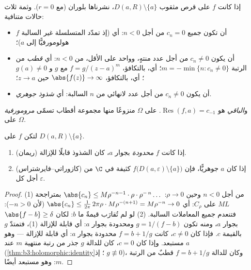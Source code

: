 \begin{definition}\label{def:b3:residues:singularities}
إذا كانت $f$  على قرص مثقوب $D(a, R)\setminus
\{a\}$، نشرناها بلوران
(مع $r = 0$). وثمة ثلاث حالات متنافية:
\begin{itemize}
  \item أن تكون جميع $c_n = 0$ من أجل $n < 0$: أي \emph{} (إذ تمدّد المتسلسلة غير السالبة $f$
        هولومورفيًّا إلى $a$)؛
  \item أن يكون $c_n \neq 0$ من أجل عدد منتهٍ، وواحد على
        الأقل، من $n < 0$: أي \emph{قطب} من الرتبة $m = -\min\{n : c_n \neq 0\}$؛ أي،
        بالتكافؤ، $f = g/(z-a)^m$ مع $g$  و $g(a)
        \neq 0$؛
        أي، بالتكافؤ، $\abs{f(z)} \to \infty$ حين $z\to
        a$؛
  \item أن يكون $c_n \neq 0$ من أجل عدد لانهائي من $n$ السالبة: أي
        \emph{شذوذ جوهري}.
\end{itemize}
و\emph{الباقي} هو $\operatorname{Res}(f, a) = c_{-1}$.  على
$\Omega$ منزوعًا منها مجموعة أقطاب تسمّى
\emph{مرومورفية} على $\Omega$.
\end{definition}

\begin{theorem}
\label{thm:b3:residues:riemanncw}
لتكن $f$  على $D(a,R)\setminus\{a\}$.
\begin{enumerate}
  \item (ريمان) إذا كانت $f$ \emph{محدودة} بجوار $a$، كان
        الشذوذ قابلًا للإزالة.
  \item (كازوراتي--فايرشتراس) إذا كان $a$ جوهريًّا، فإن $f\bigl(D(a,\varepsilon)\setminus\{a\}\bigr)$
        كثيفة في $\C$ من أجل كل $\varepsilon$.
\end{enumerate}
\end{theorem}

\begin{proof}
(1) من أجل $n < 0$ وحين $\rho \to 0$: $\abs{c_n} \leq
M\rho^{-n-1}\cdot\rho\cdot\rho^{-\,n}\dots$ بمتراجحة $ML$ على
$C_\rho$: أي $\abs{c_n} \leq \frac{1}{2\pi}\,2\pi\rho\cdot
M\rho^{-(n+1)} = M\rho^{-n} \to 0$ (لأن $-n > 0$): فتنعدم جميع المعاملات
السالبة.
(2) لو لم تُقارَب قيمةٌ ما $b$: لكان $\abs{f - b} \geq
\delta$ بجوار $a$، ومنه
تكون $g = 1/(f - b)$  ومحدودة بجوار $a$: أي قابلة
للإزالة (1)، فتمتدّ $g$ بالقيمة $c$. فإذا كان $c \neq 0$، كانت
$f = b + 1/g$ محدودة بجوار $a$: أي قابلة للإزالة --- وهو
مستبعد. وإذا كان $c = 0$، كان للدالة $g$ جذر من رتبة منتهية $m$ عند
$a$ (\cref{thm:b3:holomorphic:identity}؛ إذ $g \not\equiv 0$)، وكان للدالة $f = b + 1/g$
قطبٌ من الرتبة $m$: وهو مستبعد أيضًا.
\end{proof}

